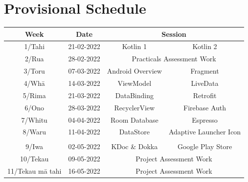 \documentclass{article}
\begin{document}
\section*{Provisional Schedule}

\renewcommand{\arraystretch}{1.5}
\begin{tabular}{|c|c|c|c|}
	\hline
	\textbf{Week}           & \textbf{Date}     & \multicolumn{2}{c|}{\textbf{Session}}                                             \\ \hline
	\small 1/Tahi           & \small 21-02-2022 & \small Kotlin 1                                   & \small Kotlin 2               \\ \hline
	\small 2/Rua            & \small 28-02-2022 & \multicolumn{2}{c|}{Practicals Assessment Work}                                   \\ \hline
	\small 3/Toru           & \small 07-03-2022 & \small Android Overview                           & \small Fragment               \\ \hline
	\small 4/Whā            & \small 14-03-2022 & \small ViewModel                                  & \small LiveData               \\ \hline
	\small 5/Rima           & \small 21-03-2022 & \small DataBinding                                & \small Retrofit               \\ \hline
	\small 6/Ono            & \small 28-03-2022 & \small RecyclerView                               & \small Firebase Auth          \\ \hline
	\small 7/Whitu          & \small 04-04-2022 & \small Room Database                              & \small Espresso               \\ \hline
	\small 8/Waru           & \small 11-04-2022 & \small DataStore                                  & \small Adaptive Launcher Icon \\ \hline
	\rowcolor{yellow} \multicolumn{4}{|c|}{\footnotesize Mid Term Break}                                                            \\ \hline
	\small 9/Iwa            & \small 02-05-2022 & \small KDoc \& Dokka                              & \small Google Play Store      \\ \hline
	\small 10/Tekau         & \small 09-05-2022 & \multicolumn{2}{c|}{\small Project Assessment Work}                                      \\ \hline
	\small 11/Tekau mā tahi & \small 16-05-2022 & \multicolumn{2}{c|}{\small Project Assessment Work}                                      \\ \hline

\end{tabular}
\end{document}
